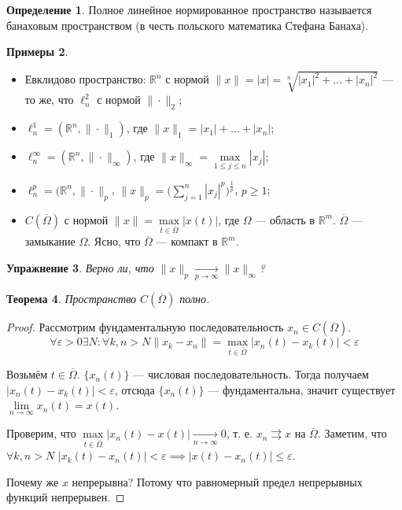 \documentclass[11pt,openany,a4paper]{scrartcl}
\theoremstyle{plain}
\newtheorem{theorem}{Теорема}[section]
\newtheorem{exercise}[theorem]{Упражнение}
\theoremstyle{definition}
\newtheorem{definition}[theorem]{Определение}
\newtheorem{examples}[theorem]{Примеры}
\newcommand\mb{\mathbb}
\newcommand\real{\mb R}
\newcommand{\uto}{\rightrightarrows}
\newcommand{\underto}[1]{\xrightarrow[#1]{}}
\begin{document}
\begin{definition}
    Полное линейное нормированное пространство называется банаховым пространством (в честь
    польского математика Стефана Банаха).
\end{definition}
\begin{examples}
\mbox{}
    \begin{itemize}
        \item Евклидово пространство: $\real^n$ с нормой
        $\|x\| = |x| = \sqrt[n]{|x_1|^2 + \ldots + |x_n|^2}$ — то же, что
        $\ell_n^2$ с нормой $\|\cdot \|_2$;
        \item $\ell_n^1 = (\real^n, \|\cdot\|_1)$, где
        $\|x\|_1 = |x_1| + \ldots + |x_n|$;
        \item $\ell_n^\infty = (\real^n, \|\cdot\|_\infty)$,
        где $\|x\|_\infty = \max\limits_{1 \leqslant j \leqslant n} |x_j|$;
        \item $\ell_n^p = (\real^n, \|\cdot\|_p$,
        $\|x\|_p = \bigg(\sum\limits_{j=1}^n |x_j|^p\bigg)^{\frac{1}{p}}$,
        $p \geqslant 1$;
        \item $C(\overline \Omega)$ с нормой
        $\|x\| = \max\limits_{t \in \overline \Omega} |x(t)|$, где
        $\Omega$ — область в $\real^m$. $\overline\Omega$ — замыкание
        $\Omega$. Ясно, что $\overline \Omega$ — компакт в
        $\real^m$.
    \end{itemize}
\end{examples}
\begin{exercise}
    Верно ли, что $\|x\|_p \underto{p \to \infty} \|x\|_\infty$?
\end{exercise}

\begin{theorem}
    Пространство $C(\overline \Omega)$ полно.
\end{theorem}
\begin{proof}
    Рассмотрим фундаментальную последовательность $x_n \in C(\overline \Omega)$.
    $$
    \forall \varepsilon > 0 \exists N: \forall k, n > N \|x_k - x_n\| =
    \max_{t \in \overline \Omega} |x_n(t) - x_k(t)| < \varepsilon
    $$

    Возьмём $t \in \overline \Omega$. $\{x_n(t)\}$ — числовая последовательность.
    Тогда получаем $|x_n(t) - x_k(t)| < \varepsilon$, отсюда $\{x_n(t)\}$ —
    фундаментальна, значит существует $\lim\limits_{n \to \infty} x_n(t) = x(t)$.

    Проверим, что $\max\limits_{t \in \overline \Omega} |x_n(t) - x(t)|
    \underto{n \to \infty} 0$, т. е. $x_n \uto x$ на $\overline \Omega$.
    Заметим, что $\forall k, n > N$ $|x_k(t) - x_n(t)| < \varepsilon \implies
    |x(t) - x_n(t)| \leqslant \varepsilon$.

    Почему же $x$ непрерывна? Потому что равномерный предел непрерывных функций
    непрерывен.

\end{proof}
\end{document}
